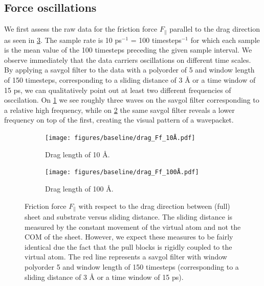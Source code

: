 \subsection{Force oscillations}\label{sec:force_oscillations}
We first assess the raw data for the friction force $F_{\parallel}$ parallel to the drag direction as seen in \cref{fig:drag_Ff}. The sample rate is 10 ps$^{-1}$ = 100 timesteps$^{-1}$ for which each sample is the mean value of the 100 timesteps preceding the given sample interval. We observe immediately that the data carriers oscillations on different time scales. By applying a savgol filter to the data with a polyorder of 5 and window length of 150 timesteps, corresponding to a sliding distance of 3 Å or a time window of 15 ps, we can qualitatively point out at least two different frequencies of osccilation. On \cref{fig:drag_Ff_10} we see roughly three waves on the savgol filter corresponding to a relative high frequency, while on \cref{fig:drag_Ff_100} the same savgol filter reveals a lower frequency on top of the first, creating the visual pattern of a wavepacket.

\begin{figure}[H]
  \centering
  \begin{subfigure}[t]{0.49\textwidth}
      \centering
      \texttt{[image: figures/baseline/drag\_Ff\_10Å.pdf]}
      \caption{Drag length of 10 Å.}
      \label{fig:drag_Ff_10}
  \end{subfigure}
  \hfill
  \begin{subfigure}[t]{0.49\textwidth}
      \centering
      \texttt{[image: figures/baseline/drag\_Ff\_100Å.pdf]}
      \caption{Drag length of 100 Å.}
      \label{fig:drag_Ff_100}
  \end{subfigure}
  \hfill
     \caption{Friction force $F_\parallel$ with respect to the drag direction between (full) sheet and substrate versus sliding distance. The sliding distance is measured by the constant movement of the virtual atom and not the COM of the sheet. However, we expect these measures to be fairly identical due the fact that the pull blocks is rigidly coupled to the virtual atom. The red line represents a savgol filter with window polyorder 5 and window length of 150 timesteps (corresponding to a sliding distance of 3 Å or a time window of 15 ps).}
     \label{fig:drag_Ff}
\end{figure}

